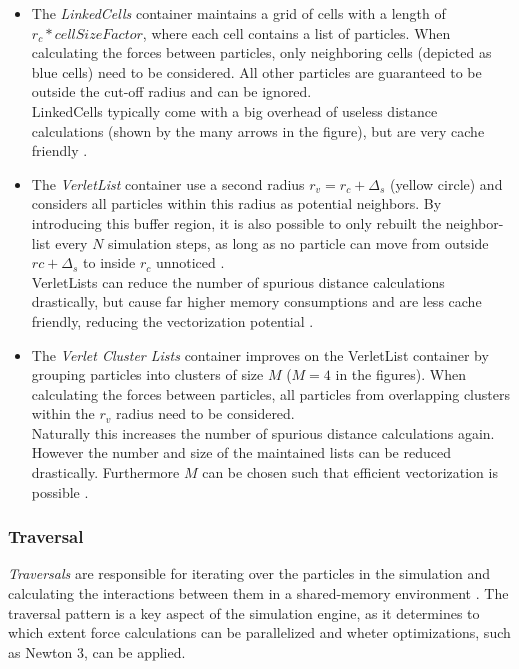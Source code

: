 \documentclass[conference]{IEEEtran}
\begin{document}
\begin{itemize}
    \item The \textit{LinkedCells} container maintains a grid of cells with a length of ${r_c} * \textit{cellSizeFactor}$, where each cell contains a list of particles. When calculating the forces between particles, only neighboring cells (depicted as blue cells) need to be considered. All other particles are guaranteed to be outside the cut-off radius and can be ignored. \\
          LinkedCells typically come with a big overhead of useless distance calculations (shown by the many arrows in the figure), but are very cache friendly \cite{Gratl2022AutoPas}.

    \item The \textit{VerletList} container use a second radius $r_v = {r_c} + \Delta_s$ (yellow circle) and considers all particles within this radius as potential neighbors. By introducing this buffer region, it is also possible to only rebuilt the neighbor-list every $N$ simulation steps, as long as no particle can move from outside $rc+ \Delta_s$ to inside $r_c$ unnoticed \cite{NEWCOME2023115278}. \\
          VerletLists can reduce the number of spurious distance calculations drastically, but cause far higher memory consumptions and are less cache friendly, reducing the vectorization potential \cite{Gratl2022AutoPas}.

    \item The \textit{Verlet Cluster Lists} container improves on the VerletList container by grouping particles into clusters of size $M$ ($M=4$ in the figures). When calculating the forces between particles, all particles from overlapping clusters within the $r_v$ radius need to be considered.\\
          Naturally this increases the number of spurious distance calculations again. However the number and size of the maintained lists can be reduced drastically. Furthermore $M$ can be chosen such that efficient vectorization is possible \cite{Gratl2022AutoPas}.

\end{itemize}


\subsubsection{Traversal}

\textit{Traversals} are responsible for iterating over the particles in the simulation and calculating the interactions between them in a shared-memory environment \cite{SECKLER2021101296}. The traversal pattern is a key aspect of the simulation engine, as it determines to which extent force calculations can be parallelized and wheter optimizations, such as Newton 3, can be applied.
\end{document}
